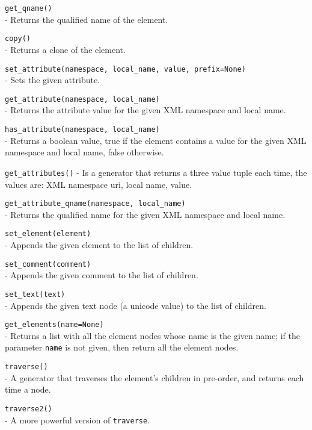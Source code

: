 \begin{api}
    {\tt get\_qname()}\\
    - Returns the qualified name of the element.

    {\tt copy()}\\
    - Returns a clone of the element.

    {\tt set\_attribute(namespace, local\_name, value, prefix=None)}\\
    - Sets the given attribute.

    {\tt get\_attribute(namespace, local\_name)}\\
    - Returns the attribute value for the given XML namespace and local name.

    {\tt has\_attribute(namespace, local\_name)}\\
    - Returns a boolean value, true if the element contains a value for the
      given XML namespace and local name, false otherwise.

    {\tt get\_attributes()}
    - Is a generator that returns a three value tuple each time, the values
      are: XML namespace uri, local name, value.

    {\tt get\_attribute\_qname(namespace, local\_name)}\\
    - Returns the qualified name for the given XML namespace and local name.

    {\tt set\_element(element)}\\
    - Appends the given element to the list of children.

    {\tt set\_comment(comment)}\\
    - Appends the given comment to the list of children.

    {\tt set\_text(text)}\\
    - Appends the given text node (a unicode value) to the list of children.

    {\tt get\_elements(name=None)}\\
    - Returns a list with all the element nodes whose name is the given
    name; if the parameter {\tt name} is not given, then return all the
    element nodes.

    {\tt traverse()}\\
    - A generator that traverses the element's children in pre-order, and
      returns each time a node.

    {\tt traverse2()}\\
    - A more powerful version of {\tt traverse}.
\end{api}


